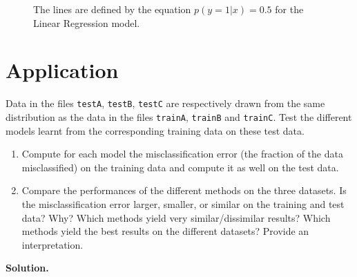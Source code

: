 \documentclass[a4paper, 11pt]{report}
\begin{document}
\begin{enumerate}[label=\alph*]
\begin{figure}[!htb]
          \label{fig:linreg_c}
        \endminipage
        \caption{The lines are defined by the equation $p(y=1|x)=0.5$ for the Linear Regression model.}
        \label{fig:lin-reg-plot}
        \end{figure}
\end{enumerate}

\section{Application}

Data in the files \texttt{testA}, \texttt{testB}, \texttt{testC} are respectively drawn from the same distribution as the data in the files \texttt{trainA}, \texttt{trainB} and \texttt{trainC}. Test the different models learnt from the corresponding training data on these test data.

\begin{enumerate}[label=\alph*]
    \item Compute for each model the misclassification error (\ie the fraction of the data misclassified) on the training data and compute it as well on the test data.
    
    \item Compare the performances of the different methods on the three datasets. Is the misclassification error larger, smaller, or similar on the training and test data? Why? Which methods yield very similar/dissimilar results? Which methods yield the best results on the different datasets? Provide an interpretation.
\end{enumerate}

\textbf{Solution.} \\
\end{document}
